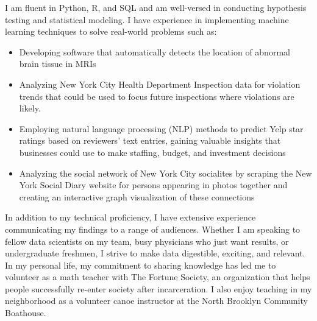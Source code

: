 \documentclass[11pt, a4paper]{awesome-cv}
\begin{document}
\begin{cvletter}
I am fluent in Python, R, and SQL and am well-versed in conducting hypothesis testing and statistical modeling. I have experience in implementing machine learning techniques to solve real-world problems such as:
\begin{itemize}
  \item Developing software that automatically detects the location of abnormal brain tissue in MRIs
  \item Analyzing New York City Health Department Inspection data for violation trends that could be used to focus future inspections where violations are likely.
  \item Employing natural language processing (NLP) methods to predict Yelp star ratings based on reviewers’ text entries, gaining valuable insights that businesses could use to make staffing, budget, and investment decisions
  \item Analyzing the social network of New York City socialites by scraping the New York Social Diary website for persons appearing in photos together and creating an interactive graph visualization of these connections
\end{itemize}

In addition to my technical proficiency, I have extensive experience communicating my findings to a range of audiences. Whether I am speaking to fellow data scientists on my team, busy physicians who just want results, or undergraduate freshmen, I strive to make data digestible, exciting, and relevant. In my personal life, my commitment to sharing knowledge has led me to volunteer as a math teacher with The Fortune Society, an organization that helps people successfully re-enter society after incarceration. I also enjoy teaching in my neighborhood as a volunteer canoe instructor at the North Brooklyn Community Boathouse.


\end{cvletter}
\end{document}
